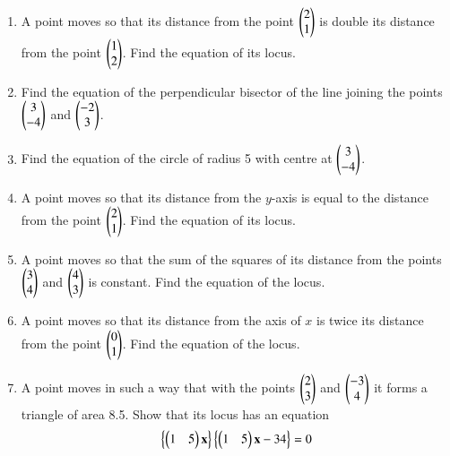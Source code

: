 \renewcommand{\theequation}{\theenumi}

\begin{enumerate}[label=\arabic*.,ref=\thesubsection.\theenumi]
\item A point moves so that its distance from the point $\begin{pmatrix}2\\1\end{pmatrix}$ is double its distance from the point $\begin{pmatrix}1\\2\end{pmatrix}$.  Find
the equation of its locus.
\item Find the equation of the perpendicular bisector of the line joining the points $\begin{pmatrix}3\\-4\end{pmatrix}$ and $\begin{pmatrix}-2\\3\end{pmatrix}$.
\item Find the equation of the circle of radius 5 with centre at $\begin{pmatrix}3\\-4\end{pmatrix}$.
\item A point moves so that its distance from the $y$-axis is equal to the distance from the point $\begin{pmatrix}2\\1\end{pmatrix}$. Find the equation of its locus.
\item  A point moves so that the sum of the squares of its distance from the points $\begin{pmatrix}3\\4\end{pmatrix}$ and $\begin{pmatrix}4\\3\end{pmatrix}$ is constant.  Find the equation of the
locus.
\item A point moves so that its distance from the axis of $x$ is twice its distance from the point $\begin{pmatrix}0\\1\end{pmatrix}$.  Find the equation of the locus.
\item A point moves in such a way that with the points $\begin{pmatrix}2\\3\end{pmatrix}$ and $\begin{pmatrix}-3\\4\end{pmatrix}$ it forms a triangle of area 8.5.  Show that its locus has an equation
\begin{equation}
\left\{\begin{pmatrix}1 & 5\end{pmatrix}\mathbf{x}\right\}\left\{\begin{pmatrix}1 & 5\end{pmatrix}\mathbf{x}-34\right\} = 0
\end{equation}


\end{enumerate}
